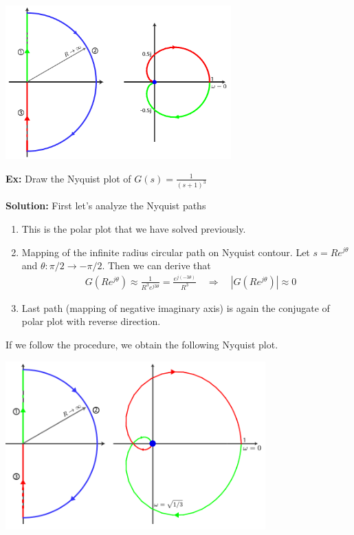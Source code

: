 \documentclass{article}
\begin{document}
  \begin{minipage}[h]{1\linewidth}
    \begin{center}
      \includegraphics[width=0.65\textwidth]{figs/ex3}
    \end{center}
  \end{minipage}

\vspace{12 pt}

\textbf{Ex:} Draw the Nyquist plot of $G(s) =
\frac{1}{(s+1)^3}$ 

\textbf{Solution:} First let's analyze the Nyquist paths
%
\begin{enumerate}

  \item This is the polar plot that we have solved previously. 
  \item Mapping of the infinite radius circular path on
    Nyquist contour. Let $s = R e^{j \theta}$ and $\theta : \pi/2 \to -\pi/2$.  Then 
   we can derive that  
   \begin{align*}
     & G \left( R e^{j \theta} \right) \approx \frac{1}{R^3 e^{j
       3 \theta}} = \frac{e^{j (-3 \theta)}}{R^3}
	\quad
    \Rightarrow  \quad | G \left( R e^{j \theta} \right) | \approx 0
   \end{align*}
   \item Last path (mapping of negative imaginary axis) is again
   the conjugate of polar plot with reverse direction. 
\end{enumerate}

If we follow the procedure, we obtain the following Nyquist plot. 

\vspace{6 pt}

  \begin{minipage}[h]{1\linewidth}
    \begin{center}
      \includegraphics[width=0.75\textwidth]{figs/ex4}
    \end{center}
  \end{minipage}
\end{document}
